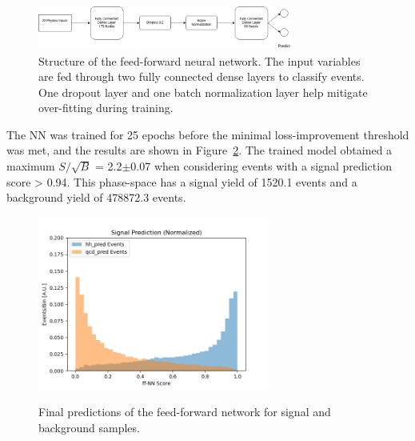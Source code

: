 \begin{figure}[!h] 
\begin{center}
\includegraphics*[width=0.75\textwidth] {ffNN/figures/flowchart_ffNN.png}
\caption{Structure of the feed-forward neural network. The input variables are fed through two fully connected dense layers to classify events. One dropout layer and one batch normalization layer help mitigate over-fitting during training.}
  \label{fig:nn}
\end{center}
\end{figure}

The NN was trained for 25 epochs before the minimal loss-improvement threshold was met, and the results are shown in Figure~\ref{fig:results_nn}. The trained model obtained a maximum $S/\sqrt{B}$ = 2.2$\pm$0.07 when considering events with a signal prediction score > 0.94. This phase-space has a signal yield of 1520.1 events and a background yield of 478872.3 events.

\begin{figure}[!h] 
\begin{center}
   \includegraphics[width = 3in]{ffNN/figures/score_ffnn_v2}\\
\caption{Final predictions of the feed-forward network for signal and background samples.}
  \label{fig:results_nn}
\end{center}
\end{figure}

